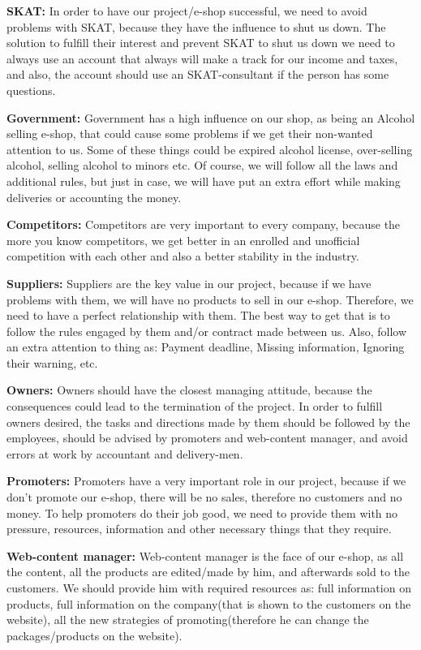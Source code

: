 \documentclass[12p]{article}
\begin{document}
\textbf{SKAT:}
In order to have our project/e-shop successful, we need to avoid problems with SKAT, because they have the influence to shut us down. The solution to fulfill their interest and prevent SKAT to shut us down we need to always use an account that always will make a track for our income and taxes, and also, the account should use an SKAT-consultant if the person has some questions.

\textbf{Government:}
Government has a high influence on our shop, as being an Alcohol selling e-shop, that could cause some problems if we get their non-wanted attention to us. Some of these things could be expired alcohol license, over-selling alcohol, selling alcohol to minors etc. Of course, we will follow all the laws and additional rules, but just in case, we will have put an extra effort while making deliveries or accounting the money.

\textbf{Competitors:}
Competitors are very important to every company, because the more you know competitors, we get better in an enrolled and unofficial competition with each other and also a better stability in the industry.

\textbf{Suppliers:}
Suppliers are the key value in our project, because if we have problems with them, we will have no products to sell in our e-shop. Therefore, we need to have a perfect relationship with them. The best way to get that is to follow the rules engaged by them and/or contract made between us. Also, follow an extra attention to thing as: Payment deadline, Missing information, Ignoring their warning, etc.

\textbf{Owners:}
Owners should have the closest managing attitude, because the consequences could lead to the termination of the project. In order to fulfill owners desired, the tasks and directions made by them should be followed by the employees, should be advised by promoters and web-content manager, and avoid errors at work by accountant and delivery-men.

\textbf{Promoters:}
Promoters have a very important role in our project, because if we don't promote our e-shop, there will be no sales, therefore no customers and no money. To help promoters do their job good, we need to provide them with no pressure, resources, information and other necessary things that they require.

\textbf{Web-content manager:}
Web-content manager is the face of our e-shop, as all the content, all the products are edited/made by him, and afterwards sold to the customers. We should provide him with required resources as: full information on products, full information on the company(that is shown to the customers on the website), all the new strategies of promoting(therefore he can change the packages/products on the website).
\end{document}

